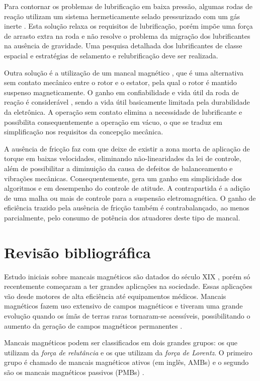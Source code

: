 Para contornar os problemas de lubrificação em baixa pressão, algumas rodas de reação  utilizam um sistema hermeticamente selado pressurizado com um gás inerte \citep{Krishnan2010}. Esta solução relaxa os requisitos de lubrificação, porém impõe uma força de arrasto extra na roda e não resolve o problema da migração dos lubrificantes na ausência de gravidade. Uma pesquisa detalhada dos lubrificantes de classe espacial e estratégias de selamento e relubrificação deve ser realizada.

Outra solução é a utilização de um mancal magnético \citep{Bangcheng2012}, que é uma alternativa sem contato mecânico entre o rotor e o estator, pela qual o rotor é mantido suspenso magneticamente. O ganho em confiabilidade e vida útil da roda de reação é considerável \citep{Marble2006}, sendo a vida útil basicamente limitada  pela durabilidade da eletrônica. A operação sem contato elimina a necessidade de lubrificante e possibilita consequentemente a operação em vácuo, o que se traduz em simplificação nos requisitos da concepção mecânica. 

A ausência de fricção faz com que deixe de existir a zona morta de aplicação de torque em baixas velocidades, eliminando não-linearidades da lei de controle, além de possibilitar a diminuição da causa de defeitos de balanceamento e vibrações mecânicas. Consequentemente, gera um ganho em simplicidade dos algoritmos e em desempenho do controle de atitude. A contrapartida é a adição de uma malha ou mais de controle para a suspensão eletromagnética. O ganho de eficiência trazido pela ausência de fricção também é contrabalançado, ao menos parcialmente, pelo consumo de potência dos atuadores deste tipo de mancal.


\section{Revisão bibliográfica}


Estudo iniciais sobre mancais magnéticos são datados do século XIX \citep{Weise1989}, porém só recentemente começaram a ter grandes aplicações na sociedade. Essas aplicações vão desde motores de alta eficiência até equipamentos médicos. Mancais magnéticos fazem uso extensivo de campos magnéticos e tiveram uma grande evolução quando os ímãs de terras raras tornaram-se acessíveis, possibilitando o aumento da geração de campos magnéticos permanentes \citep{Furlani2001}.

Mancais magnéticos podem ser classificados em dois grandes grupos: os que utilizam da \textit{força de relutância} e os que utilizam da \textit{força de Lorentz}. O primeiro grupo é chamado de mancais magnéticos ativos (em inglês, AMBs) e o segundo são os mancais magnéticos passivos (PMBs) \citep{Schweitzer2009}.

